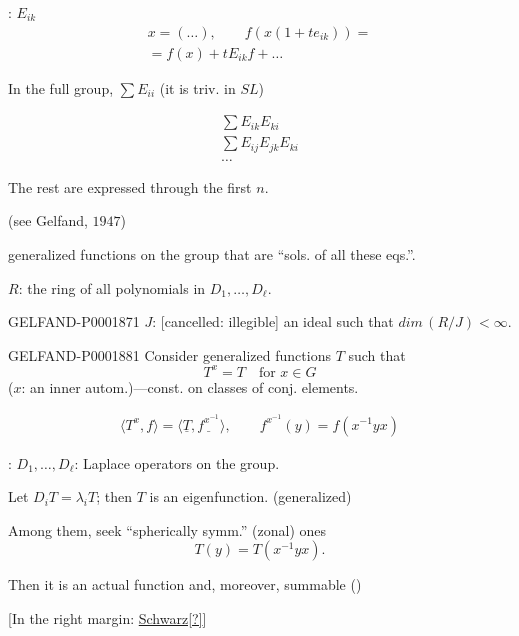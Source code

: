 : $E_{ik}$
\begin{gather*}
x=(\ldots),\qquad f (x (1+te_{ik}))={}\\
{}=f (x)+tE_{ik}f+\ldots
\end{gather*}

In the full group, $\sum E_{ii}$ (it is triv. in $SL$)

\begin{gather*}
\sum E_{ik}E_{ki}\\
\sum E_{ij}E_{jk}E_{ki}\\
\ldots
\end{gather*}

The rest are expressed through the first $n$.

(see Gelfand, \underline{$1947$})

  generalized functions on the group that are “sols. of all these eqs.”.

$R$: the ring of all polynomials in $D_1,\ldots, D_\ell$.

\begin{GelfandAdjacentEvidence}{GELFAND-P000187}{1}
$J$: [cancelled: illegible] an ideal such that $dim\,(R/J)<\infty$.
\end{GelfandAdjacentEvidence}




\begin{GelfandAdjacentEvidence}{GELFAND-P000188}{1}
Consider generalized functions $T$ such that
\begin{equation*}T^x=T\quad\text{for }x\in G\end{equation*}
($x$: an inner autom.)—const. on classes of conj. elements.

\begin{gather*}
\langle T^x, f\rangle=\langle\underline{T},\underline{f^{x^{-1}}}\rangle,\qquad
f^{x^{-1}}(y)=f (x^{-1}yx)
\end{gather*}

: $D_1,\ldots, D_\ell$: Laplace operators on the group.

Let $D_iT=\lambda_iT$; then $T$ is an eigenfunction. (generalized)

Among them, seek “spherically symm.” (zonal) ones
\begin{equation*}T (y)=T (x^{-1}yx).\end{equation*}

Then it is an actual function and, moreover, summable ()

[In the right margin: \underline{Schwarz[?]}]
\end{GelfandAdjacentEvidence}

